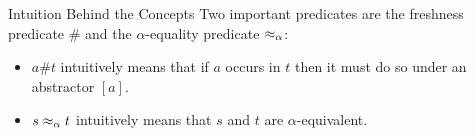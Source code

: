 \begin{frame}{Intuition Behind the Concepts}
    Two important predicates are the freshness predicate $\#$ and the $\alpha$-equality
    predicate $\mathrel{\approx_\alpha}$: 
    \begin{itemize}
        \item $a\#t$ intuitively means that if $a$ occurs in $t$ then it must do so
            under an abstractor $[a]$. 
        \item $s \mathrel{\approx_\alpha} t$ intuitively means that $s$ and $t$ are $\alpha$-equivalent.
    \end{itemize}
\end{frame}


%


